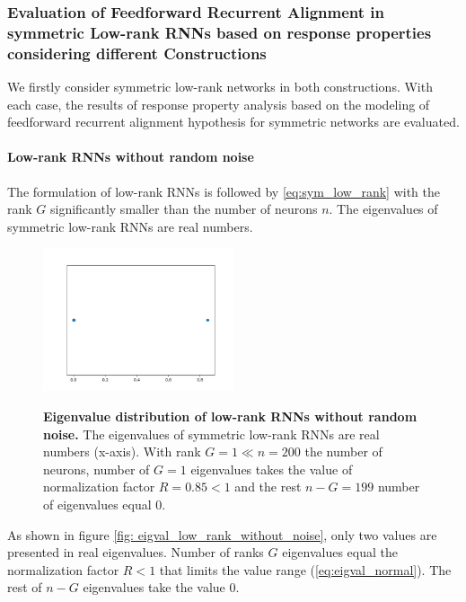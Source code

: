 \documentclass[11pt]{article}
\begin{document}
	\subsubsection{Evaluation of Feedforward Recurrent Alignment in symmetric Low-rank RNNs based on response properties considering different Constructions}
	We firstly consider symmetric low-rank networks in both constructions. With each case, the results of response property analysis based on the modeling of feedforward recurrent alignment hypothesis for symmetric networks are evaluated. 
	
	\paragraph{Low-rank RNNs without random noise}
	The formulation of low-rank RNNs is followed by \ref{eq:sym_low_rank} with the rank $G$ significantly smaller than the number of neurons $n$. The eigenvalues of symmetric low-rank RNNs are real numbers. 
		\begin{figure} 
			\centering 
			\caption{\textbf{Eigenvalue distribution of low-rank RNNs without random noise.} The eigenvalues of symmetric low-rank RNNs are real numbers (x-axis). With rank $G = 1 \ll n = 200$ the number of neurons, number of $G = 1$ eigenvalues takes the value of normalization factor $R = 0.85 < 1$ and the rest $n-G = 199$ number of eigenvalues equal $0$. }
			\includegraphics[width=0.5\textwidth]{../figures/eigval_low_rank_sym_no_noise.png}
			\label{fig:eigval_low_rank_without_noise}
		\end{figure}
	
	As shown in figure \ref{fig: eigval_low_rank_without_noise}, only two values are presented in real eigenvalues. Number of ranks $G$ eigenvalues equal the normalization factor $R < 1$ that limits the value range (\ref{eq:eigval_normal}). The rest of $n-G$ eigenvalues take the value $0$. 
	
\end{document}

